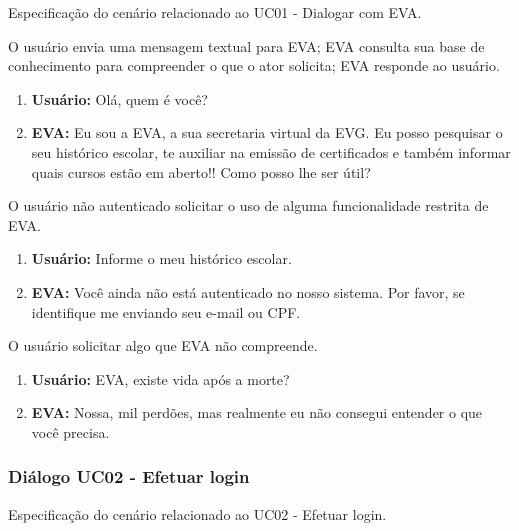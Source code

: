 Especificação do cenário relacionado ao UC01 - Dialogar com EVA.

    
    O usuário envia uma mensagem textual para EVA; EVA consulta sua base de conhecimento para compreender o que o ator solicita; EVA responde ao usuário.
    
    \begin{enumerate}[label=\alph*)]
        \tightlist
        \item \textbf{Usuário:} Olá, quem é você?
        \item \textbf{EVA:} Eu sou a EVA, a sua secretaria virtual da EVG. Eu posso pesquisar o seu histórico escolar, te auxiliar na emissão de certificados e também informar quais cursos estão em aberto!! Como posso lhe ser útil?
    \end{enumerate}
    
    
O usuário não autenticado solicitar o uso de alguma funcionalidade restrita de EVA.
    
    \begin{enumerate}[label=\alph*)]
        \tightlist
            \item \textbf{Usuário:} Informe o meu histórico escolar.
            \item \textbf{EVA:} Você ainda não está autenticado no nosso sistema. Por favor, se identifique me enviando seu e-mail ou CPF.
        \end{enumerate}
    
O usuário solicitar algo que EVA não compreende.
    
    \begin{enumerate}[label=\alph*)]
        \tightlist
        \item \textbf{Usuário:} EVA, existe vida após a morte?
        \item \textbf{EVA:} Nossa, mil perdões, mas realmente eu não consegui entender o que você precisa.
    \end{enumerate}

\subsubsection{Diálogo UC02 - Efetuar login}

Especificação do cenário relacionado ao UC02 - Efetuar login.

    
